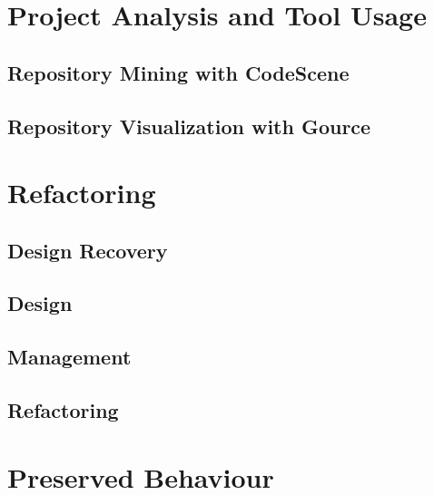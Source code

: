 \documentclass[11pt]{article}
\begin{document}
	\section{Project Analysis and Tool Usage}
	\subsection{Repository Mining with CodeScene}
	\subsection{Repository Visualization with Gource}
	
	\section{Refactoring}
	\subsection{Design Recovery}
	\subsection{Design}
	\subsection{Management}
	\subsection{Refactoring}
	
	\section{Preserved Behaviour}
\end{document}

